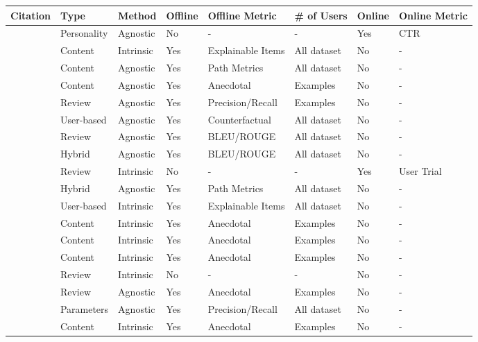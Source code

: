 \begin{tabular}{llllllll}
\toprule
Citation & Type & Method & Offline & Offline Metric & # of Users & Online & Online Metric \\
\midrule
\cite{takami_flanagan_dai_ogata_2023} & Personality & Agnostic & No & - & - & Yes & CTR \\
\cite{lin_zhang_lin_zeng_zhou_wu_2024} & Content & Intrinsic & Yes & Explainable Items & All dataset & No & - \\
\cite{zanon_da_rocha_manzato_2024} & Content & Agnostic & Yes & Path Metrics & All dataset & No & - \\
\cite{samih_ghadi_fennan_2023} & Content & Agnostic & Yes & Anecdotal & Examples & No & - \\
\cite{li_liu_zhang_kou_liu_qu_2025} & Review & Agnostic & Yes & Precision/Recall & Examples & No & - \\
\cite{wen_liu_jing_yu_2024} & User-based & Agnostic & Yes & Counterfactual & All dataset & No & - \\
\cite{long_jin_2024} & Review & Agnostic & Yes & BLEU/ROUGE & All dataset & No & - \\
\cite{jendal_le_lauw_lissandrini_dolog_hose_2024} & Hybrid & Agnostic & Yes & BLEU/ROUGE & All dataset & No & - \\
\cite{zhong_negre_2022} & Review & Intrinsic & No & - & - & Yes & User Trial \\
\cite{alizadeh_noughabi_behkamal_zarrinkalam_kahani_2024} & Hybrid & Agnostic & Yes & Path Metrics & All dataset & No & - \\
\cite{zhang_zhu_wang_2023} & User-based & Intrinsic & Yes & Explainable Items & All dataset & No & - \\
\cite{zheng_chen_cao_peng_huang_2024} & Content & Intrinsic & Yes & Anecdotal & Examples & No & - \\
\cite{wang_xie_ding_chen_xiang_2025} & Content & Intrinsic & Yes & Anecdotal & Examples & No & - \\
\cite{sang_yang_zhang_liao_2025} & Content & Intrinsic & Yes & Anecdotal & Examples & No & - \\
\cite{9811151} & Review & Intrinsic & No & - & - & No & - \\
\cite{8622439} & Review & Agnostic & Yes & Anecdotal & Examples & No & - \\
\cite{10741116} & Parameters & Agnostic & Yes & Precision/Recall & All dataset & No & - \\
\cite{9607106} & Content & Intrinsic & Yes & Anecdotal & Examples & No & - \\

\end{tabular}
